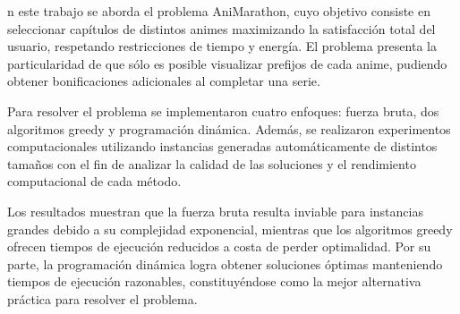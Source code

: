 n este trabajo se aborda el problema AniMarathon, cuyo objetivo consiste en seleccionar capítulos de distintos animes maximizando la satisfacción total del usuario, respetando restricciones de tiempo y energía. El problema presenta la particularidad de que sólo es posible visualizar prefijos de cada anime, pudiendo obtener bonificaciones adicionales al completar una serie.

Para resolver el problema se implementaron cuatro enfoques: fuerza bruta, dos algoritmos greedy y programación dinámica. Además, se realizaron experimentos computacionales utilizando instancias generadas automáticamente de distintos tamaños con el fin de analizar la calidad de las soluciones y el rendimiento computacional de cada método.

Los resultados muestran que la fuerza bruta resulta inviable para instancias grandes debido a su complejidad exponencial, mientras que los algoritmos greedy ofrecen tiempos de ejecución reducidos a costa de perder optimalidad. Por su parte, la programación dinámica logra obtener soluciones óptimas manteniendo tiempos de ejecución razonables, constituyéndose como la mejor alternativa práctica para resolver el problema.